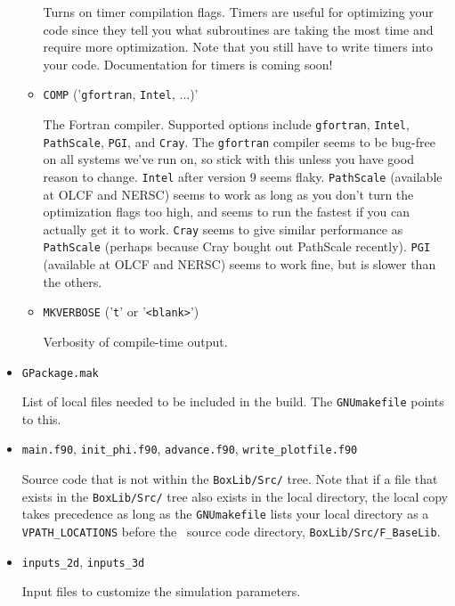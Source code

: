 \begin{itemize}
\begin{itemize}
    Turns on timer compilation flags.  Timers are useful for optimizing your code since they tell you 
    what subroutines are taking the most time and require more optimization.  Note that you still have 
    to write timers into your code.  Documentation for timers is coming soon!

    \item {\tt COMP} ('{\tt gfortran}, {\tt Intel}, $\ldots$)'

    The Fortran compiler.  Supported options include {\tt gfortran}, {\tt Intel}, 
    {\tt PathScale}, {\tt PGI}, and {\tt Cray}.  The {\tt gfortran} compiler seems to be 
    bug-free on all systems we've run on, so stick with this unless you have good reason to 
    change.  {\tt Intel} after version 9 seems flaky.  {\tt PathScale} (available 
    at OLCF and NERSC) seems to work as long as you don't turn the optimization flags 
    too high, and seems to run the fastest if you can actually get it to work.  
    {\tt Cray} seems to give similar performance as {\tt PathScale} (perhaps
    because Cray bought out PathScale recently).  {\tt PGI} (available at OLCF and NERSC) 
    seems to work fine, but is slower than the others.

    \item {\tt MKVERBOSE} ('{\tt t}' or '{\tt <blank>}')

    Verbosity of compile-time output.

  \end{itemize}

\item {\tt GPackage.mak}

List of local files needed to be included in the build.  The {\tt GNUmakefile} points to this.

\item {\tt main.f90}, {\tt init\_phi.f90}, {\tt advance.f90}, {\tt write\_plotfile.f90}

Source code that is not within the {\tt BoxLib/Src/} tree.  Note that 
if a file that exists in the
{\tt BoxLib/Src/} tree also exists in the local directory, the local copy takes precedence
as long as the {\tt GNUmakefile} lists your local directory as a {\tt VPATH\_LOCATIONS} 
before the \BoxLib\ source code directory, {\tt BoxLib/Src/F\_BaseLib}.

\item {\tt inputs\_2d}, {\tt inputs\_3d}

Input files to customize the simulation parameters.

\end{itemize}

